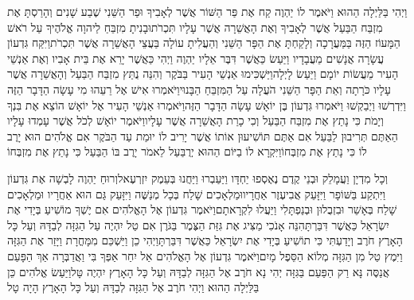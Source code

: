 \documentclass[../main/main.tex]{subfiles}
\begin{document}
\begin{multicols*}{\ncols}
וַיְהִי בַּלַּיְלָה הַהוּא וַיֹּאמֶר לוֹ יַהְוֶה קַח אֶת פַּר הַשּׁוֹר אֲשֶׁר לְאָבִיךָ וּפַר הַשֵּׁנִי שֶׁבַע שָׁנִים וְהָרַסְתָּ אֶת מִזְבַּח הַבַּעַל אֲשֶׁר לְאָבִיךָ וְאֶת הָאֲשֵׁרָה אֲשֶׁר עָלָיו תִּכְרֹת\PreVerseSpace{}וּבָנִיתָ מִזְבֵּחַ לַיהוָה אֱלֹהֶיךָ עַל רֹאשׁ הַמָּעוֹז הַזֶּה בַּמַּעֲרָכָה וְלָקַחְתָּ אֶת הַפָּר הַשֵּׁנִי וְהַעֲלִיתָ עוֹלָה בַּעֲצֵי הָאֲשֵׁרָה אֲשֶׁר תִּכְרֹת\PreVerseSpace{}וַיִּקַּח גִּדְעוֹן עֲשָׂרָה אֲנָשִׁים מֵעֲבָדָיו וַיַּעַשׂ כַּאֲשֶׁר דִּבֶּר אֵלָיו יַהְוֶה וַיְהִי כַּאֲשֶׁר יָרֵא אֶת בֵּית אָבִיו וְאֶת אַנְשֵׁי הָעִיר מֵעֲשׂוֹת יוֹמָם וַיַּעַשׂ לָיְלָה\PreVerseSpace{}וַיַּשְׁכִּימוּ אַנְשֵׁי הָעִיר בַּבֹּקֶר וְהִנֵּה נֻתַּץ מִזְבַּח הַבַּעַל וְהָאֲשֵׁרָה אֲשֶׁר עָלָיו כֹּרָתָה וְאֵת הַפָּר הַשֵּׁנִי הֹעֲלָה עַל הַמִּזְבֵּחַ הַבָּנוּי\PreVerseSpace{}וַיֹּאמְרוּ אִישׁ אֶל רֵעֵהוּ מִי עָשָׂה הַדָּבָר הַזֶּה וַיִּדְרְשׁוּ וַיְבַקְשׁוּ וַיֹּאמְרוּ גִּדְעוֹן בֶּן יוֹאָשׁ עָשָׂה הַדָּבָר הַזֶּה\PreVerseSpace{}וַיֹּאמְרוּ אַנְשֵׁי הָעִיר אֶל יוֹאָשׁ הוֹצֵא אֶת בִּנְךָ וְיָמֹת כִּי נָתַץ אֶת מִזְבַּח הַבַּעַל וְכִי כָרַת הָאֲשֵׁרָה אֲשֶׁר עָלָיו\PreVerseSpace{}וַיֹּאמֶר יוֹאָשׁ לְכֹל אֲשֶׁר עָמְדוּ עָלָיו הַאַתֶּם תְּרִיבוּן לַבַּעַל אִם אַתֶּם תּוֹשִׁיעוּן אוֹתוֹ אֲשֶׁר יָרִיב לוֹ יוּמַת עַד הַבֹּקֶר אִם אֱלֹהִים הוּא יָרֶב לוֹ כִּי נָתַץ אֶת מִזְבְּחוֹ\PreVerseSpace{}וַיִּקְרָא לוֹ בַיּוֹם הַהוּא יְרֻבַּעַל לֵאמֹר יָרֶב בּוֹ הַבַּעַל כִּי נָתַץ אֶת מִזְבְּחוֹ\OpenSection{}\par
{}וְכָל מִדְיָן וַעֲמָלֵק וּבְנֵי קֶדֶם נֶאֶסְפוּ יַחְדָּו וַיַּעַבְרוּ וַיַּחֲנוּ בְּעֵמֶק יִזְרְעֶאל\PreVerseSpace{}וְרוּחַ יַהְוֶה לָבְשָׁה אֶת גִּדְעוֹן וַיִּתְקַע בַּשּׁוֹפָר וַיִּזָּעֵק אֲבִיעֶזֶר אַחֲרָיו\PreVerseSpace{}וּמַלְאָכִים שָׁלַח בְּכָל מְנַשֶּׁה וַיִּזָּעֵק גַּם הוּא אַחֲרָיו וּמַלְאָכִים שָׁלַח בְּאָשֵׁר וּבִזְבֻלוּן וּבְנַפְתָּלִי וַיַּעֲלוּ לִקְרָאתָם\PreVerseSpace{}וַיֹּאמֶר גִּדְעוֹן אֶל הָאֱלֹהִים אִם יֶשְׁךָ מוֹשִׁיעַ בְּיָדִי אֶת יִשְׂרָאֵל כַּאֲשֶׁר דִּבַּרְתָּ\PreVerseSpace{}הִנֵּה אָנֹכִי מַצִּיג אֶת גִּזַּת הַצֶּמֶר בַּגֹּרֶן אִם טַל יִהְיֶה עַל הַגִּזָּה לְבַדָּהּ וְעַל כָּל הָאָרֶץ חֹרֶב וְיָדַעְתִּי כִּי תוֹשִׁיעַ בְּיָדִי אֶת יִשְׂרָאֵל כַּאֲשֶׁר דִּבַּרְתָּ\PreVerseSpace{}וַיְהִי כֵן וַיַּשְׁכֵּם מִמָּחֳרָת וַיָּזַר אֶת הַגִּזָּה וַיִּמֶץ טַל מִן הַגִּזָּה מְלוֹא הַסֵּפֶל מָיִם\PreVerseSpace{}וַיֹּאמֶר גִּדְעוֹן אֶל הָאֱלֹהִים אַל יִחַר אַפְּךָ בִּי וַאֲדַבְּרָה אַךְ הַפָּעַם אֲנַסֶּה נָּא רַק הַפַּעַם בַּגִּזָּה יְהִי נָא חֹרֶב אֶל הַגִּזָּה לְבַדָּהּ וְעַל כָּל הָאָרֶץ יִהְיֶה טָּל\PreVerseSpace{}וַיַּעַשׂ אֱלֹהִים כֵּן בַּלַּיְלָה הַהוּא וַיְהִי חֹרֶב אֶל הַגִּזָּה לְבַדָּהּ וְעַל כָּל הָאָרֶץ הָיָה טָל\OpenSection{}\par

\end{multicols*}
\end{document}

